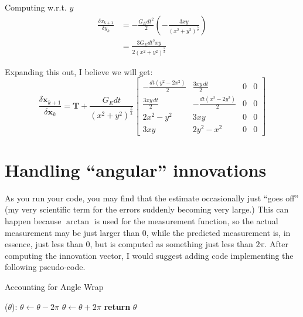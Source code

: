 \documentclass{article}
\newcommand{\mb}[1]{\mathbf{#1}}
\begin{document}
Computing w.r.t. $y$
\begin{equation}
    \begin{split}
    \frac{\delta x_{k+1}}{\delta y_k} &= -\frac{G_E dt^2}{2}\left(-\frac{3xy}{(x^2+y^2)^{\frac{5}{2}}}\right)\\
        &= \frac{3 G_E dt^2 xy}{2(x^2+y^2)^{\frac{5}{2}}}
    \end{split}
\end{equation}

Expanding this out, I believe we will get:
\begin{equation}
    \frac{\delta \mb{x}_{k+1}}{\delta \mb{x}_k} = \mb{T} + \frac{G_E dt}{(x^2+y^2)^{\frac{5}{2}}}
    \begin{bmatrix}
        -\frac{dt (y^2-2x^2)}{2} & \frac{3xy\, dt }{2} & 0 & 0\\
        \frac{3xy\,dt}{2} & -\frac{dt (x^2-2y^2)}{2} & 0 & 0\\
        2x^2-y^2 & 3xy & 0 & 0\\
        3xy & 2y^2-x^2 & 0 & 0
    \end{bmatrix}
\end{equation}

\section{Handling ``angular'' innovations}
As you run your code, you may find that the estimate occasionally just ``goes off'' (my very scientific term for the errors suddenly becoming very large.)  This can happen because $\arctan$ is used for the measurement function, so the actual measurement may be just larger than 0, while the predicted measurement is, in essence, just less than 0, but is computed as something just less than $2\pi$.  After computing the innovation vector, I would suggest adding code implementing the following pseudo-code.

\begin{algorithm}
    \caption{Accounting for Angle Wrap}
    \begin{algorithmic}[1]
        ($\theta$):
            \If{$\theta>\pi$}
                \State $\theta \gets \theta-2\pi$
            \ElsIf{$\theta < -\pi$}
                \State $\theta \gets \theta+2\pi$
            \EndIf
            \State \textbf{return} $\theta$
        \EndProcedure
    \end{algorithmic}
\end{algorithm}
\end{document}
